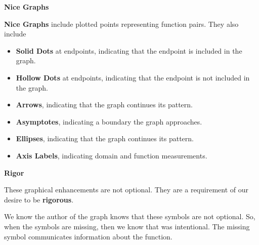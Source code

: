 \documentclass{ximera}
\begin{document}
\begin{summary} \textbf{\textcolor{red!70!yellow}{Nice Graphs}}

\textbf{Nice Graphs} include plotted points representing function pairs.  They also include

\begin{itemize}
\item \textbf{Solid Dots} at endpoints, indicating that the endpoint is included in the graph.
\item \textbf{Hollow Dots} at endpoints, indicating that the endpoint is not included in the graph.
\item \textbf{Arrows}, indicating that the graph continues its pattern.
\item \textbf{Asymptotes}, indicating a boundary the graph approaches.
\item \textbf{Ellipses}, indicating that the graph continues its pattern.
\item \textbf{Axis Labels}, indicating domain and function measurements.
\end{itemize}

\end{summary}









\begin{warning} \textbf{\textcolor{red!70!black}{Rigor}}

These graphical enhancements are not optional.  They are a requirement of our desire to be \textbf{\textcolor{red!70!black}{rigorous}}.

We know the author of the graph knows that these symbols are not optional. So, when the symbols are missing, then we know that was intentional.  The missing symbol communicates information about the function.

\end{warning}
\end{document}
